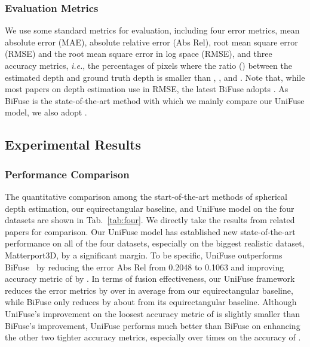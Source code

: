 \documentclass[letterpaper, 10 pt, conference]{ieeeconf}
\def\ie{\emph{i.e.}}
\begin{document}
\subsubsection{Evaluation Metrics}
We use some standard metrics for evaluation, including four error metrics, mean absolute error (MAE), absolute relative error (Abs Rel), root mean square error (RMSE) and the root mean square error in log space (RMSE), and three accuracy metrics, \ie, the percentages of pixels where the ratio () between the estimated depth and ground truth depth is smaller than , , and . Note that, while most papers on depth estimation use  in RMSE, the latest BiFuse adopts . As BiFuse is the state-of-the-art method with which we mainly compare our UniFuse model, we also adopt . 




\begin{table}[t]
\vspace{5pt}
  \centering
\caption{\textbf{The Statistics of the Datasets.}}
\label{tab:datasets}
\end{table}


\subsection{Experimental Results}

\subsubsection{Performance Comparison}
\label{sec:pc}
The quantitative comparison among the start-of-the-art methods of spherical depth estimation, our equirectangular baseline, and UniFuse model on the four datasets are shown in Tab.~\ref{tab:four}. We directly take the results from related papers for comparison. Our UniFuse model has established new state-of-the-art performance on all of the four datasets, especially on the biggest realistic dataset, Matterport3D, by a significant margin. To be specific, UniFuse outperforms BiFuse~\cite{wang2020bifuse} by reducing the error Abs Rel from 0.2048 to 0.1063 and improving accuracy metric of  by . In terms of fusion effectiveness, our UniFuse framework reduces the error metrics by over  in average from our equirectangular baseline, while BiFuse only reduces by about  from its equirectangular baseline. Although UniFuse's improvement on the loosest accuracy metric of  is slightly smaller than BiFuse's improvement, UniFuse performs much better than BiFuse on enhancing the other two tighter accuracy metrics, especially over  times on the accuracy of . 
\end{document}
